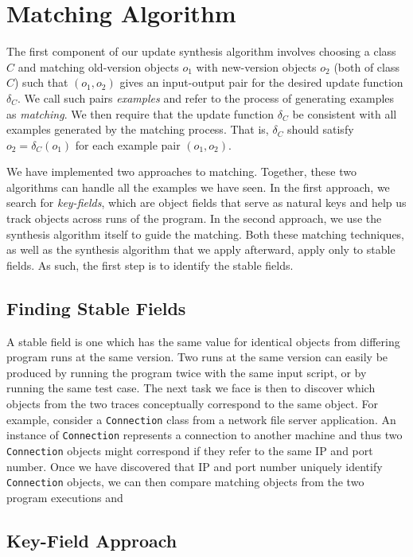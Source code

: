 \section{Matching Algorithm}

The first component of our update synthesis algorithm involves choosing a class $C$ and matching old-version objects $o_1$ with new-version objects $o_2$ (both of class $C$) such that $(o_1,o_2)$ gives an input-output pair for the desired update function $\delta_C$.  We call such pairs \emph{examples} and refer to the process of generating examples as \emph{matching}.  We then require that the update function $\delta_C$ be consistent with all examples generated by the matching process.  That is, $\delta_C$ should satisfy $o_2 = \delta_C(o_1)$ for each example pair $(o_1,o_2)$.

We have implemented two approaches to matching.  Together, these two algorithms can handle all the examples we have seen.  In the first approach, we search for \emph{key-fields}, which are object fields that serve as natural keys and help us track objects across runs of the program.  In the second approach, we use the synthesis algorithm itself to guide the matching.  Both these matching techniques, as well as the synthesis algorithm that we apply afterward, apply only to stable fields.  As such, the first step is to identify the stable fields.

\subsection{Finding Stable Fields}

A stable field is one which has the same value for identical objects from differing program runs at the same version.  Two runs at the same version can easily be produced by running the program twice with the same input script, or by running the same test case.  The next task we face is then to discover which objects from the two traces conceptually correspond to the same object.  For example, consider a \texttt{Connection} class from a network file server application.  An instance of \texttt{Connection} represents a connection to another machine and thus two \texttt{Connection} objects might correspond if they refer to the same IP and port number.  Once we have discovered that IP and port number uniquely identify \texttt{Connection} objects, we can then compare matching objects from the two program executions and 

\subsection{Key-Field Approach}

